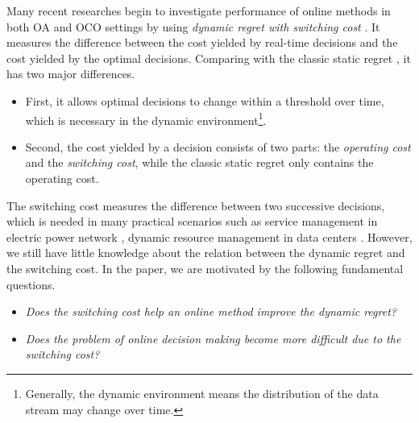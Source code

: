 \documentclass[journal]{IEEEtran}
\begin{document}
Many recent researches begin to investigate performance of online methods in both OA and OCO settings by using \textit{dynamic regret with switching cost} \cite{pmlr-v75-chen18b,Li:2018uy}. It measures the difference between the cost yielded by real-time decisions and the cost yielded by the optimal decisions.   Comparing with the classic static regret \cite{introduction-online-optimization}, it has two major differences.
\begin{itemize}
\item First, it allows optimal decisions to change within a threshold over time, which is necessary in the dynamic environment\footnote{Generally, the dynamic environment means the distribution of the data stream may change over time.}.
\item Second, the cost yielded by a decision consists of two parts: the \textit{operating cost} and the \textit{switching cost}, while the classic static regret only contains the operating cost.
\end{itemize} The switching cost measures the difference between two successive decisions, which is needed in many practical scenarios such as service management in electric power network \cite{2b1edbffc}, dynamic resource management in data centers \cite{5934885,6269026,Wang:2014:ESG:2567529.2567556}. However, we still have little knowledge about the relation between the dynamic regret and the switching cost.  In the paper, we are motivated by the following fundamental questions.
\begin{itemize}
\item \textit{Does the switching cost help an online method improve the dynamic regret?}
\item \textit{Does the problem of online decision making  become more difficult due to the switching cost?}
\end{itemize} 
\end{document}

